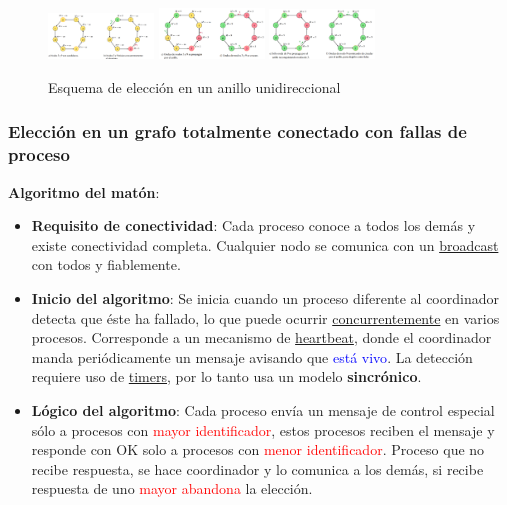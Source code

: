 \begin{figure}[H]
    \centering
    \includegraphics[width=0.25\textwidth]{img/AU_1.png}
    \includegraphics[width=0.25\textwidth]{img/AU_2.png}
    \includegraphics[width=0.25\textwidth]{img/AU_3.png}
    \caption{Esquema de elección en un anillo unidireccional}
\end{figure}

\subsubsection{Elección en un grafo totalmente conectado con fallas de proceso}

\textbf{Algoritmo del matón}:

\begin{itemize}
    \item \textbf{Requisito de conectividad}: Cada proceso conoce a todos los demás y existe conectividad completa. Cualquier nodo se comunica con un \underline{broadcast} con todos y fiablemente.

    \item \textbf{Inicio del algoritmo}: Se inicia cuando un proceso diferente al coordinador detecta que éste ha fallado, lo que puede ocurrir \underline{concurrentemente} en varios procesos. Corresponde a un mecanismo de \underline{heartbeat}, donde el coordinador manda periódicamente un mensaje avisando que \textcolor{blue}{está vivo}. La detección requiere uso de \underline{timers}, por lo tanto usa un modelo \textbf{sincrónico}.

    \item \textbf{Lógico del algoritmo}: Cada proceso envía un mensaje de control especial sólo a procesos con \textcolor{red}{mayor identificador}, estos procesos reciben el mensaje y responde con OK solo a procesos con \textcolor{red}{menor identificador}. Proceso que no recibe respuesta, se hace coordinador y lo comunica a los demás, si recibe respuesta de uno \textcolor{red}{mayor abandona} la elección.
\end{itemize}

